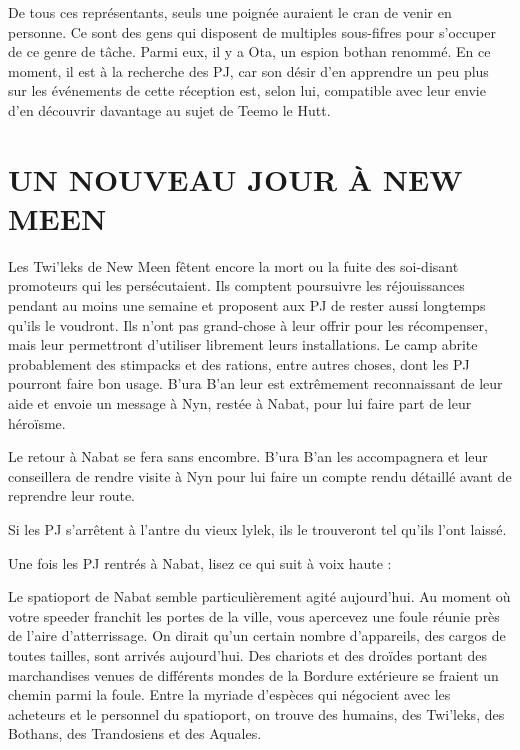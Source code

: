 \documentclass[a4paper,10pt,twoside,twocolumn,openany]{book}
\begin{document}
De tous ces représentants, seuls une poignée auraient le cran de venir en personne. Ce sont des gens
qui disposent de multiples sous-fifres pour s’occuper de ce genre de tâche. Parmi eux, il y a Ota, un espion
bothan renommé. En ce moment, il est à la recherche
des PJ, car son désir d’en apprendre un peu plus sur les
événements de cette réception est, selon lui, compatible avec leur envie d’en découvrir davantage au sujet
de Teemo le Hutt.

\section{UN NOUVEAU JOUR
À NEW MEEN}
Les Twi’leks de New Meen fêtent encore la mort ou la
fuite des soi-disant promoteurs qui les persécutaient.
Ils comptent poursuivre les réjouissances pendant au
moins une semaine et proposent aux PJ de rester aussi
longtemps qu’ils le voudront. Ils n’ont pas grand-chose à
leur offrir pour les récompenser, mais leur permettront
d’utiliser librement leurs installations. Le camp abrite
probablement des stimpacks et des rations, entre autres
choses, dont les PJ pourront faire bon usage. B’ura B’an
leur est extrêmement reconnaissant de leur aide et envoie un message à Nyn, restée à Nabat, pour lui faire
part de leur héroïsme.

Le retour à Nabat se fera sans encombre. B’ura B’an
les accompagnera et leur conseillera de rendre visite à
Nyn pour lui faire un compte rendu détaillé avant de reprendre leur route.

Si les PJ s’arrêtent à l’antre du vieux lylek, ils le trouveront tel qu’ils l’ont laissé.

\subtitle{RETOUR À NABAT}

Une fois les PJ rentrés à Nabat, lisez ce qui suit à voix
haute :

\begin{quotebox}
    
Le spatioport de Nabat semble particulièrement
agité aujourd’hui. Au moment où votre speeder
franchit les portes de la ville, vous apercevez une
foule réunie près de l’aire d’atterrissage. On dirait
qu’un certain nombre d’appareils, des cargos de
toutes tailles, sont arrivés aujourd’hui. Des chariots et des droïdes portant des marchandises
venues de différents mondes de la Bordure extérieure se fraient un chemin parmi la foule. Entre
la myriade d’espèces qui négocient avec les acheteurs et le personnel du spatioport, on trouve des
humains, des Twi’leks, des Bothans, des Trandosiens et des Aquales.\end{quotebox}
\end{document}

